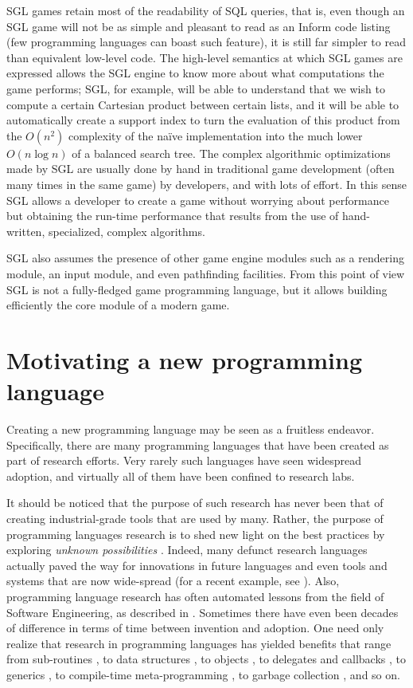 SGL games retain most of the readability of SQL queries, that is, even though an SGL game will not be as simple and pleasant to read as an Inform code listing (few programming languages can boast such feature), it is still far simpler to read than equivalent low-level code. The high-level semantics at which SGL games are expressed allows the SGL engine to know more about what computations the game performs; SGL, for example, will be able to understand that we wish to compute a certain Cartesian product between certain lists, and it will be able to automatically create a support index to turn the evaluation of this product from the $O(n^2)$ complexity of the naïve implementation into the much lower $O(n \log n)$ of a balanced search tree. The complex algorithmic optimizations made by SGL are usually done by hand in traditional game development (often many times in the same game) by developers, and with lots of effort. In this sense SGL allows a developer to create a game without worrying about performance but obtaining the run-time performance that results from the use of hand-written, specialized, complex algorithms.

SGL also assumes the presence of other game engine modules such as a rendering module, an input module, and even pathfinding facilities. From this point of view SGL is not a fully-fledged game programming language, but it allows building efficiently the core module of a modern game.


\section{Motivating a new programming language}
Creating a new programming language may be seen as a fruitless endeavor. Specifically, there are many programming languages that have been created as part of research efforts. Very rarely such languages have seen widespread adoption, and virtually all of them have been confined to research labs.

It should be noticed that the purpose of such research has never been that of creating industrial-grade tools that are used by many. Rather, the purpose of programming languages research is to shed new light on the best practices by exploring \textit{unknown possibilities} \cite{CHAPTER_1_PL_RESEARCH}. Indeed, many defunct research languages actually paved the way for innovations in future languages \cite{CHAPTER_1_PL_INFLUENCE_ON_PL} and even tools and systems that are now wide-spread (for a recent example, see \cite{CHAPTER_1_PL_INFLUENCE_ON_CURRENT_LANGUAGES}). Also, programming language research has often automated lessons from the field of Software Engineering, as described in \cite{CHAPTER_1_PL_AND_SWENG}.
Sometimes there have even been decades of difference in terms of time between invention and adoption. One need only realize that research in programming languages has yielded benefits that range from sub-routines \cite{CHAPTER_1_PL_SUBROUTINES}, to data structures \cite{CHAPTER_1_PL_DATASTRUCTURES}, to objects \cite{CHAPTER_1_PL_OBJECTS}, to delegates and callbacks \cite{CHAPTER_1_PL_HOF}, to generics \cite{CHAPTER_1_PL_INFLUENCE_ON_PL}, to compile-time meta-programming \cite{CHAPTER_1_PL_GENERIC_PROGRAMMING}, to garbage collection \cite{CHAPTER_1_PL_GARBAGE_COLLECTION}, and so on.

